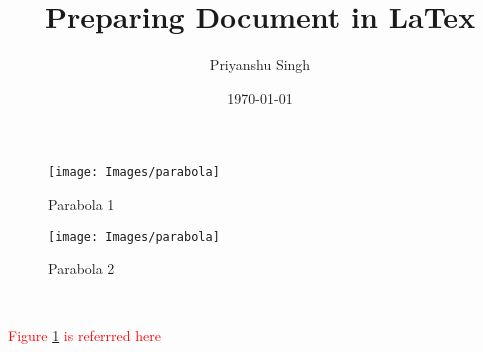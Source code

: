 \documentclass[10pt,twocolumn]{article}
\begin{document}
	\title{Preparing Document in LaTex}
	\author{Priyanshu Singh}
	\date{\today}
	\maketitle
	\blindtext
	\begin{figure*}[h]
		\begin{subfigure}[c]{0.45\textwidth}
			\texttt{[image: Images/parabola]}
			\centering
			\label{1a}
			\begin{flushright}\caption{Parabola 1}\end{flushright}
		\end{subfigure}
		\hfill
		\begin{subfigure}[c]{0.45\textwidth}
			\texttt{[image: Images/parabola]}
			\centering
			\begin{center}\caption{Parabola 2}\end{center}
		\end{subfigure}\\
	\end{figure*}
	\blindtext
	\lipsum
	\textcolor{red}{Figure \ref{1a} is referrred here}
\end{document}
